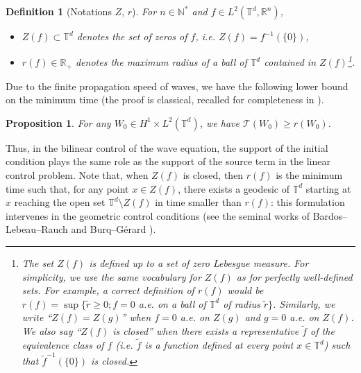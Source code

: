 \documentclass[a4paper]{article}
\theoremstyle{plain}
\newtheorem{proposition}[theorem]{Proposition}
\newtheorem{definition}[theorem]{Definition}
\newcommand{\T}{\mathbb{T}}
\newcommand{\R}{\mathbb{R}}
\begin{document}
\begin{definition}[Notations $Z$, $r$]
For $n \in \mathbb{N}^*$ and $f \in L^{2}(\T^d,\R^n)$, 
\begin{itemize}[topsep=0cm, parsep=0cm, itemsep=0cm]
%
\item $Z(f)\subset\T^d$ denotes the set of zeros of $f$, i.e.  $Z(f)=f^{-1}(\{0\})$,
%
\item $r(f)\in \R_+$ denotes the maximum radius of a ball of $\T^d$ contained in $Z(f)$\footnote{The set $Z(f)$ is defined up to a set of zero Lebesgue measure. For simplicity, we use the same vocabulary for $Z(f)$ as for perfectly well-defined sets. For example, a correct definition of $r(f)$ would be $r(f)=\sup \{ \widetilde{r} \geq 0 ; f=0$ a.e. on a ball of $\T^d$ of radius  $\widetilde{r} \}$. Similarly, we write ``$Z(f)=Z(g)$'' when $f=0$ a.e. on $Z(g)$ and $g=0$ a.e. on $Z(f)$. We also say ``$Z(f)$ is closed'' when there exists a representative $\widetilde{f}$ of the equivalence class of $f$
(i.e. $\widetilde{f}$ is a function defined at every point $x \in \T^d$) such that $\widetilde{f}^{-1}(\{0\})$ is closed.}.
\end{itemize}
\end{definition}



Due to the finite propagation speed of waves,  we have the following lower bound on the minimum time (the proof is classical, recalled for completeness in ).

\begin{proposition} \label{Prop:propagation}
For any $W_0 \in H^1 \times L^2(\T^d)$, we have $\mathcal{T}(W_0)\geq r(W_0)$.
\end{proposition}


Thus, in the bilinear control of the wave equation, the support of the initial condition plays the same role as the support of the source term in the linear control problem. Note that, when $Z(f)$ is closed, then $r(f)$ is the minimum time such that, for any point $x\in Z(f)$, there exists a geodesic of $\T^d$ starting at $x$ reaching the open set $\T^d \setminus Z(f)$ in time smaller than $r(f)$: this formulation intervenes in the geometric control conditions (see the seminal works of Bardos--Lebeau--Rauch and Burq--Gérard \cite{BLR, BurqGerard97}).

\medskip
\end{document}
